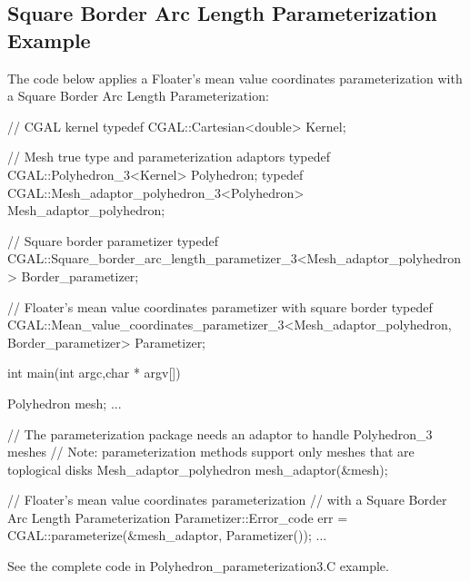 \subsection{Square Border Arc Length Parameterization Example}

The code below applies a Floater's mean value coordinates parameterization
with a Square Border Arc Length Parameterization:

\begin{ccExampleCode}

// CGAL kernel
typedef CGAL::Cartesian<double>                         Kernel;

// Mesh true type and parameterization adaptors
typedef CGAL::Polyhedron_3<Kernel>                      Polyhedron;
typedef CGAL::Mesh_adaptor_polyhedron_3<Polyhedron>     Mesh_adaptor_polyhedron;

// Square border parametizer
typedef CGAL::Square_border_arc_length_parametizer_3<Mesh_adaptor_polyhedron>
                                                      Border_parametizer;

// Floater's mean value coordinates parametizer with square border
typedef CGAL::Mean_value_coordinates_parametizer_3<Mesh_adaptor_polyhedron,
                                                    Border_parametizer>
                                                        Parametizer;

int main(int argc,char * argv[])
{
    Polyhedron mesh;
    ...

    // The parameterization package needs an adaptor to handle Polyhedron_3 meshes
    // Note: parameterization methods support only meshes that are toplogical disks
    Mesh_adaptor_polyhedron mesh_adaptor(&mesh);

    // Floater's mean value coordinates parameterization
    // with a Square Border Arc Length Parameterization
    Parametizer::Error_code err = CGAL::parameterize(&mesh_adaptor, Parametizer());
    ...
}

\end{ccExampleCode}

See the complete code in Polyhedron\_parameterization3.C example.
